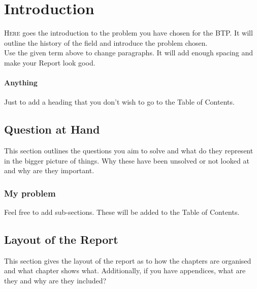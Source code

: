 \chapter{Introduction}
\lettrine[lines=1]{H}{ere} goes the introduction to the problem you have chosen for the BTP. It will outline the history of the field and introduce the problem chosen. \\[4pt]
Use the given term above to change paragraphs. It will add enough spacing and make your Report look good.

\subsubsection{Anything}
Just to add a heading that you don't wish to go to the Table of Contents.

\section{Question at Hand}
This section outlines the questions you aim to solve and what do they represent in the bigger picture of things. Why these have been unsolved or not looked at and why are they important. \cite{book1} %

\subsection{My problem}
Feel free to add sub-sections. These will be added to the Table of Contents.

\section{Layout of the Report}
This section gives the layout of the report as to how the chapters are organised and what chapter shows what. Additionally, if you have appendices, what are they and why are they included? 